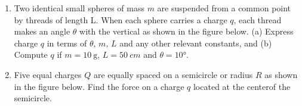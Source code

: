 \documentclass[11pt]{article}
\begin{document}
\begin{enumerate}[leftmargin=15pt]

\item Two identical small spheres of mass $m$ are suspended from a common point
  by threads of length L. When each sphere carries a charge $q$, each thread
  makes an angle $\theta$ with the vertical as shown in the figure below.
  (a) Express charge $q$ in terms of $\theta$, $m$, $L$ and any other relevant
  constants, and (b) Compute $q$ if $m=\SI{10}{\gram}$, $L=\SI{50}{cm}$ and
  $\theta=\ang{10}$.
  
  \vspace{1.35in}
  
\item Five equal charges $Q$ are equally spaced on a semicircle or radius $R$
  as shown in the figure below. Find the force on a charge $q$ located at the
  centerof the semicircle.
  

\end{enumerate}
\end{document}
